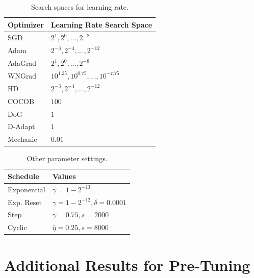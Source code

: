 \documentclass[runningheads]{llncs}
\begin{document}
\begin{table}[h]
    \centering
    \caption{Search spaces for learning rate.}
    \begin{tabular}{l l}
        \toprule
        Optimizer & Learning Rate Search Space                \\
        \midrule
        SGD       & ${2^1, 2^0, ..., 2^{-8}}$                 \\
        Adam      & ${2^{-3}, 2^{-4}, ..., 2^{-12}}$          \\
        AdaGrad   & ${2^1, 2^0, ..., 2^{-8}}$                 \\
        WNGrad    & ${10^{1.25}, 10^{0.75}, ..., 10^{-7.75}}$ \\
        HD        & ${2^{-3}, 2^{-4}, ..., 2^{-12}}$          \\
        COCOB     & $100$                                     \\
        DoG       & $1$                                       \\
        D-Adapt   & $1$                                       \\
        Mechanic  & $0.01$                                    \\
        \bottomrule
    \end{tabular}
\end{table}
\vspace{-1cm}

\begin{table}[!h]
    \centering
    \caption{Other parameter settings.}
    \begin{tabular}{l l}
        \toprule
        Schedule    & Values                                  \\
        \midrule
        Exponential & $\gamma = 1 - 2^{-13}$                  \\
        Exp. Reset  & $\gamma = 1 - 2^{-12}, \delta = 0.0001$ \\
        Step        & $\gamma = 0.75, s = 2000$               \\
        Cyclic      & $\hat{\eta} = 0.25, s = 8000$           \\
        \bottomrule
    \end{tabular}
\end{table}

\newpage
\section*{Additional Results for Pre-Tuning}
\end{document}
